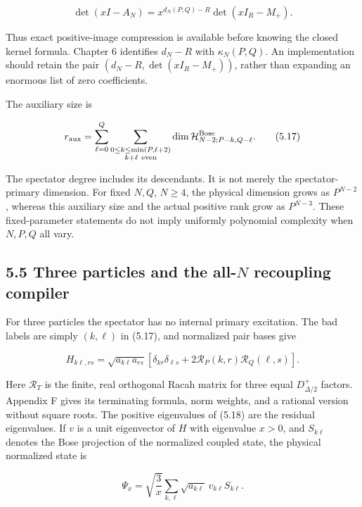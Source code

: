 \[
\det(xI-A_N)=x^{d_N(P,Q)-R}\det(xI_R-M_+).
\tag{5.16}
\]

Thus exact positive-image compression is available before knowing the closed kernel formula. Chapter 6 identifies \(d_N-R\) with \(\kappa_N(P,Q)\). An implementation should retain the pair \((d_N-R,\det(xI_R-M_+))\), rather than expanding an enormous list of zero coefficients.

The auxiliary size is

\[
r_{\rm aux}=
\sum_{\ell=0}^{Q}
\sum_{\substack{0\le k\le\min(P,\ell+2)\\k+\ell\ \mathrm{even}}}
\dim\mathcal H^{\rm Bose}_{N-2;P-k,Q-\ell}.
\tag{5.17}
\]

The spectator degree includes its descendants. It is not merely the spectator-primary dimension. For fixed \(N,Q\), \(N\ge4\), the physical dimension grows as \(P^{N-2}\), whereas this auxiliary size and the actual positive rank grow as \(P^{N-3}\). These fixed-parameter statements do not imply uniformly polynomial complexity when \(N,P,Q\) all vary.

\hypertarget{three-particles-and-the-all-n-recoupling-compiler}{%
\subsection{\texorpdfstring{5.5 Three particles and the all-\(N\) recoupling compiler}{5.5 Three particles and the all-N recoupling compiler}}\label{three-particles-and-the-all-n-recoupling-compiler}}

For three particles the spectator has no internal primary excitation. The bad labels are simply \((k,\ell)\) in (5.17), and normalized pair bases give

\[
H_{k\ell,rs}=\sqrt{a_{k\ell}a_{rs}}
\left[\delta_{kr}\delta_{\ell s}+2\mathcal R_P(k,r)\mathcal R_Q(\ell,s)\right].
\tag{5.18}
\]

Here \(\mathcal R_T\) is the finite, real orthogonal Racah matrix for three equal \(D^+_{\Delta/2}\) factors. Appendix F gives its terminating formula, norm weights, and a rational version without square roots. The positive eigenvalues of (5.18) are the residual eigenvalues. If \(v\) is a unit eigenvector of \(H\) with eigenvalue \(x>0\), and \(S_{k\ell}\) denotes the Bose projection of the normalized coupled state, the physical normalized state is

\[
\Psi_x=\sqrt{\frac3x}\sum_{k,\ell}\sqrt{a_{k\ell}}\,v_{k\ell}S_{k\ell}.
\tag{5.19}
\]

